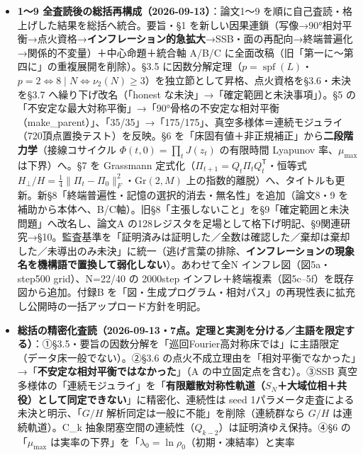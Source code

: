 \documentclass[
  a4paper,
]{ltjsarticle}
\begin{document}
\begin{itemize}
  の論文3引用を「\(N=3\)--\(20\) sympy」から「任意 \(N\)」へ、\(W\)
  既約を「\(N=3\)--\(40\) 確認」から「任意 \(N\ge3\) 証明」へ更新。追試
  \texttt{90度理論床\_整数K解析解\_全N\_20260909/parity二部構造\_解析的証明\_20260912/}。
\item
  \textbf{1〜9 全査読後の総括再構成（2026-09-13）}：論文1〜9
  を順に自己査読・格上げした結果を総括へ統合。要旨・§1
  を新しい因果連鎖（写像→90°相対平衡→点火資格→\textbf{インフレーション的急拡大}→SSB・面の再配向→終端普遍化→関係的不変量）＋中心命題＋統合軸
  A/B/C に全面改稿（旧「第一に〜第四に」の重複展開を削除）。§3.5
  に因数分解定理（\(p=\operatorname{spf}(L)\)・\(p=2\iff8\mid N\iff\nu_2(N)\ge3\)）を独立節として昇格、点火資格を§3.6・未決を§3.7
  へ繰り下げ改名（「honest な未決」→「確定範囲と未決事項」）。§5
  の「不安定な最大対称平衡」→「90°骨格の不安定な相対平衡（make\_parent）」、「35/35」→「175/175」、真空多様体＝連続モジュライ（720頂点置換テスト）を反映。§6
  を「床固有値＋非正規補正」から\textbf{二段階力学}（接線コサイクル
  \(\Phi(t,0)=\prod_t J(z_t)\) の有限時間 Lyapunov 率、\(\mu_{\max}\)
  は下界）へ。§7 を Grassmann
  定式化（\(\Pi_{t+1}=Q_t\Pi_tQ_t^{\mathsf T}\)・恒等式
  \(H_\perp/H=\tfrac14\|\Pi_t-\Pi_0\|_F^2\)・\(\mathrm{Gr}(2,M)\)
  上の指数的離脱）へ、タイトルも更新。新§8「終端普遍性・記憶の選択的消去・無名性」を追加（論文8・9
  を補助から本体へ、B/C軸）。旧§8「主張しないこと」を§9「確定範囲と未決問題」へ改名し、論文A
  の128レジスタを足場として格下げ明記、§9関連研究→§10。監査基準を「証明済みは証明した／全数は確認した／棄却は棄却した／未導出のみ未決」に統一（逃げ言葉の排除、\textbf{インフレーションの現象名を機構語で置換して弱化しない}）。あわせて全N
  インフレ図（図5a・step500 grid）、N=22/40 の 2000step
  インフレ＋終端複素（図5c--5f）を既存図から追加。付録B
  を「図・生成プログラム・相対パス」の再現性表に拡充し公開時の一括アップロード方針を明記。
\item
  \textbf{総括の精密化査読（2026-09-13・7点。定理と実測を分ける／主語を限定する）}：①§3.5・要旨の因数分解を「巡回Fourier高対称床では」に主語限定（データ床一般でない）。②§3.6
  の点火不成立理由を「相対平衡でなかった」→「\textbf{不安定な相対平衡ではなかった}」（A
  の中立固定点を含む）。③SSB
  真空多様体の「連続モジュライ」を「\textbf{有限離散対称性軌道（\(S_N\)＋大域位相＋共役）として同定できない}」に精密化、連続性は
  seed 1パラメータ走査による未決と明示、「\(G/H\)
  解析同定は一般に不能」を削除（連続群なら \(G/H\) は連続軌道）。C\_k
  抽象閉塞空間の連続性（\(Q_{k-2}\)）は証明済ゆえ保持。④§6
  の「\(\mu_{\max}\)
  は実率の下界」を「\(\lambda_0=\ln\rho_0\)（初期・凍結率）と実率

\end{itemize}
\end{document}
